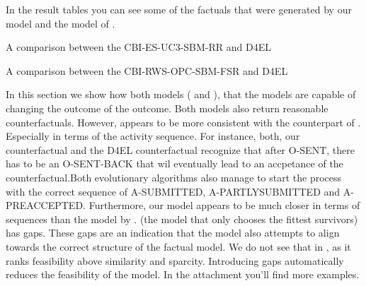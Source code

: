 \documentclass[./../../paper.tex]{subfiles}
\begin{document}
In the result tables you can see some of the factuals that were generated by our model and the model of \autocite{hsieh_DiCE4ELInterpretingProcess_2021}.  

\begin{table}
    \centering    
    \resizebox{\linewidth}{!}{
    
    }
    \caption{A comparison between the CBI-ES-UC3-SBM-RR and D4EL}
    \label{fig:exp7-RR}
\end{table}
\begin{table}
    \centering    
    \resizebox{\linewidth}{!}{
    
    
    }
\caption{A comparison between the CBI-RWS-OPC-SBM-FSR and D4EL}
\label{fig:exp7-FSR}
\end{table}

% 

% 

% 

In this section we show how both models ( and ), that the models are capable of changing the outcome of the outcome. Both models also return reasonable counterfactuals. However,  appears to be more consistent with the counterpart of \autocite{hsieh_DiCE4ELInterpretingProcess_2021}. Especially in terms of the activity sequence. For instance, both, our counterfactual and the D4EL counterfactual recognize that after O-SENT, there has to be an O-SENT-BACK that wil eventually lead to an accpetance of the counterfactual.Both evolutionary algorithms also manage to start the process with the correct sequence of A-SUBMITTED, A-PARTLYSUBMITTED and A-PREACCEPTED. Furthermore, our model appears to be much closer in terms of sequences than the model by \citeauthor{hsieh_DiCE4ELInterpretingProcess_2021}.  (the model that only chooses the fittest survivors) has gaps. These gaps are an indication that the model also attempts to align towards the correct structure of the factual model. We do not see that in , as it ranks feasibility above similarity and sparcity. Introducing gaps automatically reduces the feasibility of the model. In the attachment you'll find more examples.

\end{document}
